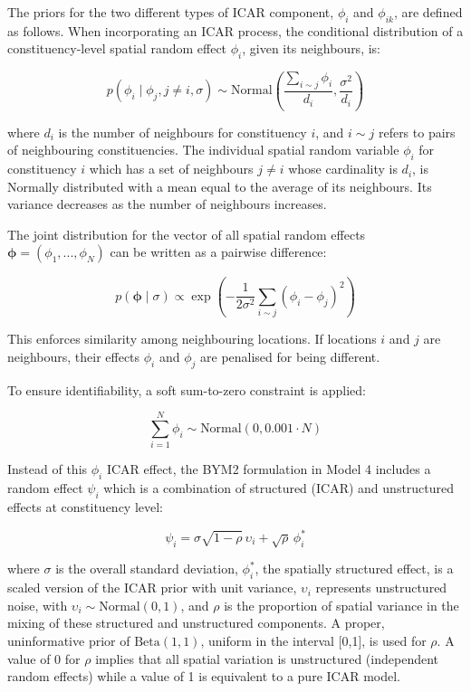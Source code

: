 \documentclass[webpdf,large,contemporary,namedate]{oup-authoring-template}
\theoremstyle{thmstyleone}
\theoremstyle{thmstyletwo}
\theoremstyle{thmstylethree}
\begin{document}
The priors for the two different types of ICAR component, \(\phi_i\) and
\(\phi_{ik}\), are defined as follows. When incorporating an ICAR
process, the conditional distribution of a constituency-level spatial
random effect \(\phi_i\), given its neighbours, is:

\[
p(\phi_i \mid \phi_j, {j \neq i}, \sigma) \sim \text{Normal}\left( \frac{\sum_{i \sim j} \phi_i} {d_i}, \frac{\sigma^2}{d_i} \right)
\]

where \(d_i\) is the number of neighbours for constituency \(i\), and
\(i \sim j\) refers to pairs of neighbouring constituencies. The
individual spatial random variable \(\phi_i\) for constituency \(i\)
which has a set of neighbours \(j \neq i\) whose cardinality is \(d_i\),
is Normally distributed with a mean equal to the average of its
neighbours. Its variance decreases as the number of neighbours
increases.

The joint distribution for the vector of all spatial random effects
\(\boldsymbol{\phi} = (\phi_1,...,\phi_N)\) can be written as a pairwise
difference:

\[
p(\boldsymbol{\phi} \mid \sigma) \propto \exp \left( -\frac{1}{2\sigma^2} \sum_{i \sim j} (\phi_i - \phi_j)^2 \right)
\]

This enforces similarity among neighbouring locations. If locations
\(i\) and \(j\) are neighbours, their effects \(\phi_i\) and \(\phi_j\)
are penalised for being different.

To ensure identifiability, a soft sum-to-zero constraint is applied:

\[
\sum_{i=1}^N \phi_i \sim \text{Normal}(0, 0.001 \cdot N)
\]

Instead of this \(\phi_i\) ICAR effect, the BYM2 formulation in Model 4
includes a random effect \(\psi_i\) which is a combination of structured
(ICAR) and unstructured effects at constituency level:

\[
\psi_i = \sigma\sqrt{1-\rho} \, \upsilon_i + \sqrt{\rho} \, \phi_i^*
\]

where \(\sigma\) is the overall standard deviation, \(\phi_i^*\), the
spatially structured effect, is a scaled version of the ICAR prior with
unit variance, \(\upsilon_i\) represents unstructured noise, with
\(\upsilon_i \sim \text{Normal}(0, 1)\), and \(\rho\) is the proportion
of spatial variance in the mixing of these structured and unstructured
components. A proper, uninformative prior of \(\text{Beta}(1,1)\),
uniform in the interval {[}0,1{]}, is used for \(\rho\). A value of 0
for \(\rho\) implies that all spatial variation is unstructured
(independent random effects) while a value of 1 is equivalent to a pure
ICAR model.
\end{document}
